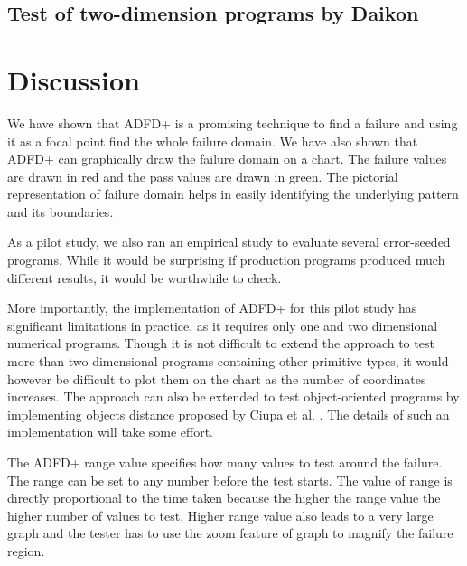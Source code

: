 \documentclass{acm_proc_article-sp}
\begin{document}
\subsection{Test of two-dimension programs by Daikon}











\section{Discussion}
We have shown that ADFD+ is a promising technique to find a failure and using it as a focal point find the whole failure domain. We have also shown that ADFD+ can graphically draw the failure domain on a chart. The failure values are drawn in red and the pass values are drawn in green. The pictorial representation of failure domain helps in easily identifying the underlying pattern and its boundaries.

As a pilot study, we also ran an empirical study to evaluate several error-seeded programs. While it would be surprising if production programs produced much different results, it would be worthwhile to check.

More importantly, the implementation of ADFD+ for this pilot study has significant limitations in practice, as it requires only one and two dimensional numerical programs. Though it is not difficult to extend the approach to test more than two-dimensional programs containing other primitive types, it would however be difficult to plot them on the chart as the number of coordinates increases. The approach can also be extended to test object-oriented programs by implementing objects distance proposed by Ciupa et al. \cite{}. The details of such an implementation will take some effort.

The ADFD+ range value specifies how many values to test around the failure. The range can be set to any number before the test starts. The value of range is directly proportional to the time taken because the higher the range value the higher number of values to test. Higher range value also leads to a very large graph and the tester has to use the zoom feature of graph to magnify the failure region.
\end{document}
